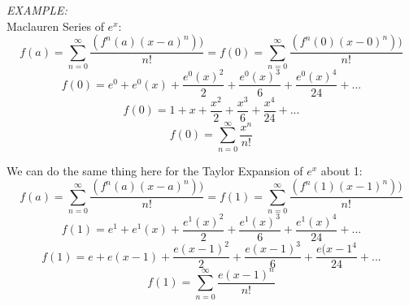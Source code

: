 \documentclass[12pt, letterpaper]{article}
\begin{document}
            \textit{EXAMPLE:}\\
            Maclauren Series of $e^x$:
            \begin{equation*}
                f(a) = \sum_{n=0}^{\infty} \frac{(f^n (a)(x-a)^n))}{n!} = f(0) = \sum_{n=0}^{\infty} \frac{(f^n (0)(x-0)^n))}{n!}
            \end{equation*}
            \begin{equation*}
                f(0) = e^0 + e^0(x) + \frac{e^0(x)^2}{2} + \frac{e^0(x)^3}{6} + \frac{e^0(x)^4}{24} + ... 
            \end{equation*}
            \begin{equation*}
                f(0) = 1 + x + \frac{x^2}{2} + \frac{x^3}{6} + \frac{x^4}{24} + ...
            \end{equation*}
            \begin{equation*}
                f(0) = \sum^{\infty}_{n=0} \frac{x^n}{n!}
            \end{equation*}

            We can do the same thing here for the Taylor Expansion of $e^x$ about 1:
            \begin{equation*}
                f(a) = \sum_{n=0}^{\infty} \frac{(f^n (a)(x-a)^n))}{n!} = f(1) = \sum_{n=0}^{\infty} \frac{(f^n (1)(x-1)^n))}{n!}
            \end{equation*}
            \begin{equation*}
                f(1) = e^1 + e^1(x) + \frac{e^1(x)^2}{2} + \frac{e^1(x)^3}{6} + \frac{e^1(x)^4}{24} + ... 
            \end{equation*}
            \begin{equation*}
                f(1) = e + e(x-1) + \frac{e(x-1)^2}{2} + \frac{e(x-1)^3}{6} + \frac{e(x-1^4}{24} + ...
            \end{equation*}
            \begin{equation*}
                f(1) = \sum^{\infty}_{n=0} \frac{e(x-1)^n}{n!}
            \end{equation*}
   
\end{document}
